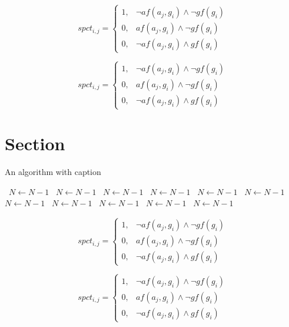 \documentclass[a4paper]{article}
\begin{document}
\begin{equation}
spct_{i,j} =
\begin{cases}
1, & \text{$\neg af(a_j,g_i) \wedge \neg gf(g_i)$}\\
0, & \text{$af(a_j,g_i) \wedge \neg gf(g_i)$}\\
0, & \text{$\neg af(a_j,g_i) \wedge gf(g_i)$}
\end{cases}
\end{equation}

\begin{equation}
spct_{i,j} =
\begin{cases}
1, & \text{$\neg af(a_j,g_i) \wedge \neg gf(g_i)$}\\
0, & \text{$af(a_j,g_i) \wedge \neg gf(g_i)$}\\
0, & \text{$\neg af(a_j,g_i) \wedge gf(g_i)$}
\end{cases}
\end{equation}

\section{Section}

\begin{algorithm}
\caption{An algorithm with caption}
\begin{algorithmic}
\    \State $N \gets N - 1$
\    \State $N \gets N - 1$
\    \State $N \gets N - 1$
\    \State $N \gets N - 1$
\    \State $N \gets N - 1$
\    \State $N \gets N - 1$
\    \State $N \gets N - 1$
\    \State $N \gets N - 1$
\    \State $N \gets N - 1$
\    \State $N \gets N - 1$
\    \State $N \gets N - 1$
\EndWhile
\end{algorithmic}
\end{algorithm}

\begin{equation}
spct_{i,j} =
\begin{cases}
1, & \text{$\neg af(a_j,g_i) \wedge \neg gf(g_i)$}\\
0, & \text{$af(a_j,g_i) \wedge \neg gf(g_i)$}\\
0, & \text{$\neg af(a_j,g_i) \wedge gf(g_i)$}
\end{cases}
\end{equation}

\begin{equation}
spct_{i,j} =
\begin{cases}
1, & \text{$\neg af(a_j,g_i) \wedge \neg gf(g_i)$}\\
0, & \text{$af(a_j,g_i) \wedge \neg gf(g_i)$}\\
0, & \text{$\neg af(a_j,g_i) \wedge gf(g_i)$}
\end{cases}
\end{equation}
\end{document}
